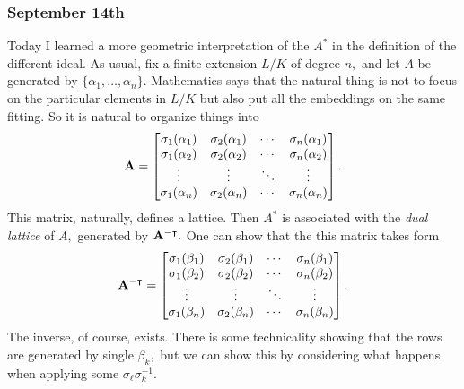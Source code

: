 \subsubsection{September 14th}
Today I learned a more geometric interpretation of the $A^*$ in the definition of the different ideal. As usual, fix a finite extension $L/K$ of degree $n,$ and let $A$ be generated by $\{\alpha_1,\ldots,\alpha_n\}.$ Mathematics says that the natural thing is not to focus on the particular elements in $L/K$ but also put all the embeddings on the same fitting. So it is natural to organize things into
\[{\bf A}=\begin{bmatrix}
    \sigma_1(\alpha_1) & \sigma_2(\alpha_1) & \cdots & \sigma_n(\alpha_1) \\
    \sigma_1(\alpha_2) & \sigma_2(\alpha_2) & \cdots & \sigma_n(\alpha_2) \\
    \vdots & \vdots & \ddots & \vdots \\
    \sigma_1(\alpha_n) & \sigma_2(\alpha_n) & \cdots & \sigma_n(\alpha_n)
\end{bmatrix}.\]
This matrix, naturally, defines a lattice. Then $A^*$ is associated with the \textit{dual lattice} of $A,$ generated by ${\bf A}^{-\intercal}.$ One can show that the this matrix takes form
\[{\bf A}^{-\intercal}=\begin{bmatrix}
    \sigma_1(\beta_1) & \sigma_2(\beta_1) & \cdots & \sigma_n(\beta_1) \\
    \sigma_1(\beta_2) & \sigma_2(\beta_2) & \cdots & \sigma_n(\beta_2) \\
    \vdots & \vdots & \ddots & \vdots \\
    \sigma_1(\beta_n) & \sigma_2(\beta_n) & \cdots & \sigma_n(\beta_n)
\end{bmatrix}.\]
The inverse, of course, exists. There is some technicality showing that the rows are generated by single $\beta_k,$ but we can show this by considering what happens when applying some $\sigma_\ell\sigma_k^{-1}.$


